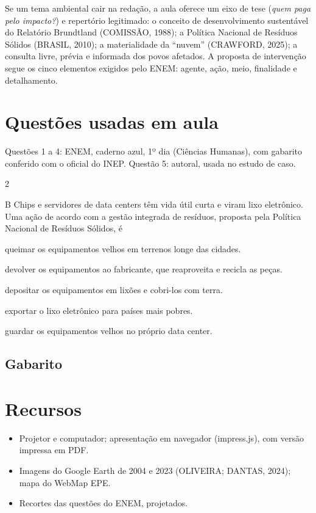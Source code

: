 \documentclass[11pt]{article}
\begin{document}
\begin{redacao}
Se um tema ambiental cair na redação, a aula oferece um eixo de tese (\emph{quem paga pelo impacto?}) e repertório
legitimado: o conceito de desenvolvimento sustentável do Relatório Brundtland (COMISSÃO, 1988); a Política Nacional
de Resíduos Sólidos (BRASIL, 2010); a materialidade da \enquote{nuvem} (CRAWFORD, 2025); a consulta livre, prévia e
informada dos povos afetados. A proposta de intervenção segue os cinco elementos exigidos pelo ENEM: agente, ação,
meio, finalidade e detalhamento.
\end{redacao}

\clearpage
\section{Questões usadas em aula}\label{sec:questoes}
Questões 1 a 4: ENEM, caderno azul, 1º dia (Ciências Humanas), com gabarito conferido com o oficial do INEP.
Questão 5: autoral, usada no estudo de caso.

\begin{multicols}{2}
\end{multicols}

\begin{questaoautoral}{B}
Chips e servidores de data centers têm vida útil curta e viram lixo eletrônico. Uma ação de acordo com a gestão
integrada de resíduos, proposta pela Política Nacional de Resíduos Sólidos, é
\alternativas
  \item queimar os equipamentos velhos em terrenos longe das cidades.
  \item devolver os equipamentos ao fabricante, que reaproveita e recicla as peças.
  \item depositar os equipamentos em lixões e cobri-los com terra.
  \item exportar o lixo eletrônico para países mais pobres.
  \item guardar os equipamentos velhos no próprio data center.
\fimalternativas
\end{questaoautoral}

\subsection*{Gabarito}
\imprimirgabarito

\section{Recursos}
\begin{itemize}
  \item Projetor e computador; apresentação em navegador (impress.js), com versão impressa em PDF.
  \item Imagens do Google Earth de 2004 e 2023 (OLIVEIRA; DANTAS, 2024); mapa do WebMap EPE.
  \item Recortes das questões do ENEM, projetados.
\end{itemize}
\end{document}
